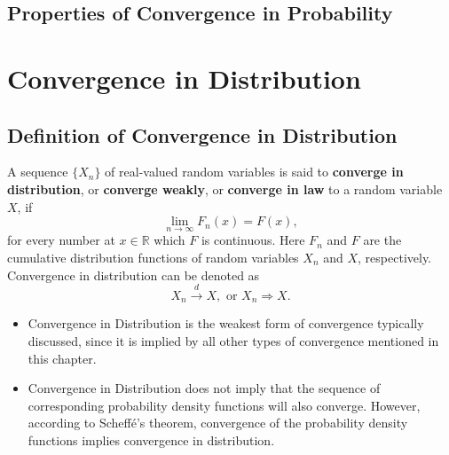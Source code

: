 \begin{definition}

\end{definition}

\subsection{Properties of Convergence in Probability}

\section{Convergence in Distribution}

\subsection{Definition of Convergence in Distribution}

\begin{definition} \label{def:convergence-in-distribution}
    A sequence $\{X_n\}$ of real-valued random variables is said to \textbf{converge in distribution}, or \textbf{converge weakly}, or \textbf{converge in law} to a random variable $X$, if
    \begin{equation}
        \lim_{n\to\infty}F_n(x)=F(x),
    \end{equation}
    for every number at $x\in\mathbb{R}$ which $F$ is continuous. Here $F_n$ and $F$ are the cumulative distribution functions of random variables $X_n$ and $X$, respectively. Convergence in distribution can be denoted as
    \begin{equation}
        X_n \stackrel{d}{\rightarrow} X, \text{ or } X_n \Rightarrow X.
    \end{equation}
\end{definition}

\begin{note}
    \begin{itemize}
        \item Convergence in Distribution is the weakest form of convergence typically discussed, since it is implied by all other types of convergence mentioned in this chapter.
        \item Convergence in Distribution does not imply that the sequence of corresponding probability density functions will also converge. However, according to Scheff\'e's theorem, convergence of the probability density functions implies convergence in distribution.
    \end{itemize}
\end{note}

